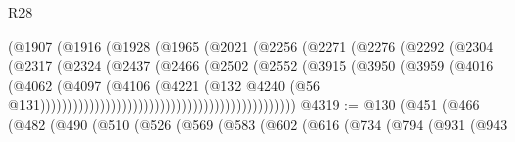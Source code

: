 \begin{lexlean}{R28}
\begin{coremodule}
                                              (@1907
                                                (@1916
                                                  (@1928
                                                    (@1965
                                                      (@2021
                                                        (@2256
                                                          (@2271
                                                            (@2276
                                                              (@2292
                                                                (@2304
                                                                  (@2317
                                                                    (@2324
                                                                      (@2437
                                                                        (@2466
                                                                          (@2502
                                                                            (@2552
                                                                              (@3915
                                                                                (@3950
                                                                                  (@3959
                                                                                    (@4016
                                                                                      (@4062
                                                                                        (@4097
                                                                                          (@4106
                                                                                            (@4221
                                                                                              (@132
                                                                                                @4240
                                                                                                (@56
                                                                                                  @131)))))))))))))))))))))))))))))))))))))))))))))))
@4319 := @130
    (@451
      (@466
        (@482
          (@490
            (@510
              (@526
                (@569
                  (@583
                    (@602
                      (@616
                        (@734
                          (@794
                            (@931
                              (@943

\end{coremodule}
\end{lexlean}
